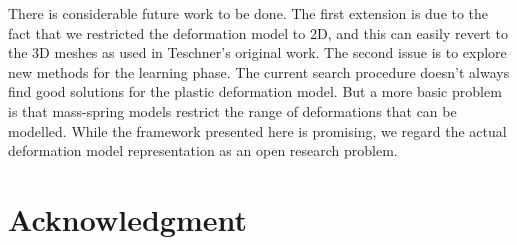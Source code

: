 \documentclass[journal]{IEEEtran}
\begin{document}
There is considerable future work to be done. The first extension is due to the fact that we restricted the deformation model to 2D, and this can easily revert to the 3D meshes as used in Teschner's original work. The second issue is to explore new methods for the learning phase. The current search procedure doesn't always find good solutions for the plastic deformation model. But a more basic problem is that mass-spring models restrict the range of deformations that can be modelled. While the framework presented here is promising, we regard the actual deformation model representation as an open research problem.



%





\section*{Acknowledgment}
\end{document}
